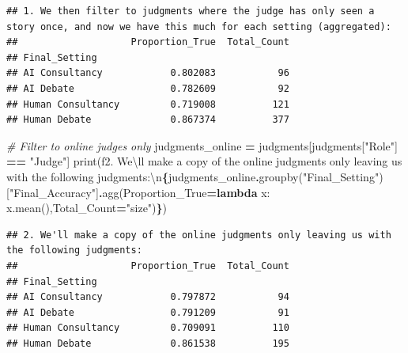\documentclass[
]{article}
\newenvironment{Shaded}{\begin{snugshade}}{\end{snugshade}}
\newcommand{\BuiltInTok}[1]{#1}
\newcommand{\CharTok}[1]{\textcolor[rgb]{0.31,0.60,0.02}{#1}}
\newcommand{\CommentTok}[1]{\textcolor[rgb]{0.56,0.35,0.01}{\textit{#1}}}
\newcommand{\KeywordTok}[1]{\textcolor[rgb]{0.13,0.29,0.53}{\textbf{#1}}}
\newcommand{\NormalTok}[1]{#1}
\newcommand{\OperatorTok}[1]{\textcolor[rgb]{0.81,0.36,0.00}{\textbf{#1}}}
\newcommand{\SpecialCharTok}[1]{\textcolor[rgb]{0.81,0.36,0.00}{\textbf{#1}}}
\newcommand{\SpecialStringTok}[1]{\textcolor[rgb]{0.31,0.60,0.02}{#1}}
\newcommand{\StringTok}[1]{\textcolor[rgb]{0.31,0.60,0.02}{#1}}
\begin{document}
\begin{verbatim}
## 1. We then filter to judgments where the judge has only seen a story once, and now we have this much for each setting (aggregated):
##                    Proportion_True  Total_Count
## Final_Setting                                  
## AI Consultancy            0.802083           96
## AI Debate                 0.782609           92
## Human Consultancy         0.719008          121
## Human Debate              0.867374          377
\end{verbatim}

\begin{Shaded}
\begin{Highlighting}[]
\CommentTok{\# Filter to online judges only}
\NormalTok{judgments\_online }\OperatorTok{=}\NormalTok{ judgments[judgments[}\StringTok{"Role"}\NormalTok{] }\OperatorTok{==} \StringTok{"Judge"}\NormalTok{]}
\BuiltInTok{print}\NormalTok{(}\SpecialStringTok{f\textquotesingle{}2. We}\CharTok{\textbackslash{}\textquotesingle{}}\SpecialStringTok{ll make a copy of the online judgments only leaving us with the following judgments:}\CharTok{\textbackslash{}n}\SpecialCharTok{\{}\NormalTok{judgments\_online}\SpecialCharTok{.}\NormalTok{groupby(}\StringTok{"Final\_Setting"}\NormalTok{)[}\StringTok{"Final\_Accuracy"}\NormalTok{]}\SpecialCharTok{.}\NormalTok{agg(Proportion\_True}\OperatorTok{=}\KeywordTok{lambda}\NormalTok{ x: x.mean(),Total\_Count}\OperatorTok{=}\StringTok{"size"}\NormalTok{)}\SpecialCharTok{\}}\SpecialStringTok{\textquotesingle{}}\NormalTok{)}
\end{Highlighting}
\end{Shaded}

\begin{verbatim}
## 2. We'll make a copy of the online judgments only leaving us with the following judgments:
##                    Proportion_True  Total_Count
## Final_Setting                                  
## AI Consultancy            0.797872           94
## AI Debate                 0.791209           91
## Human Consultancy         0.709091          110
## Human Debate              0.861538          195
\end{verbatim}
\end{document}
